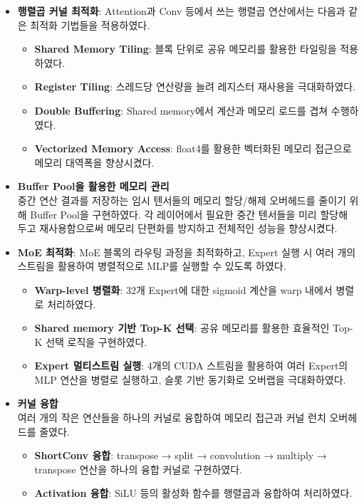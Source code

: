 \documentclass[10pt]{article}
\begin{document}
\begin{itemize}
\item \textbf{행렬곱 커널 최적화}: Attention과 Conv 등에서 쓰는 행렬곱 연산에서는 다음과 같은 최적화 기법들을 적용하였다.
\begin{itemize}[noitemsep]
    \item \textbf{Shared Memory Tiling}: 블록 단위로 공유 메모리를 활용한 타일링을 적용하였다.
    \item \textbf{Register Tiling}: 스레드당 연산량을 늘려 레지스터 재사용을 극대화하였다.
    \item \textbf{Double Buffering}: Shared memory에서 계산과 메모리 로드를 겹쳐 수행하였다.
    \item \textbf{Vectorized Memory Access}: float4를 활용한 벡터화된 메모리 접근으로 메모리 대역폭을 향상시켰다.
\end{itemize}

\item \textbf{Buffer Pool을 활용한 메모리 관리}\\
중간 연산 결과를 저장하는 임시 텐서들의 메모리 할당/해제 오버헤드를 줄이기 위해 Buffer Pool을 구현하였다. 각 레이어에서 필요한 중간 텐서들을 미리 할당해 두고 재사용함으로써 메모리 단편화를 방지하고 전체적인 성능을 향상시켰다.

\item \textbf{MoE 최적화}: MoE 블록의 라우팅 과정을 최적화하고, Expert 실행 시 여러 개의 스트림을 활용하여 병렬적으로 MLP를 실행할 수 있도록 하였다.
\begin{itemize}[noitemsep]
    \item \textbf{Warp-level 병렬화}: 32개 Expert에 대한 sigmoid 계산을 warp 내에서 병렬로 처리하였다.
    \item \textbf{Shared memory 기반 Top-K 선택}: 공유 메모리를 활용한 효율적인 Top-K 선택 로직을 구현하였다.
    \item \textbf{Expert 멀티스트림 실행}: 4개의 CUDA 스트림을 활용하여 여러 Expert의 MLP 연산을 병렬로 실행하고, 슬롯 기반 동기화로 오버랩을 극대화하였다.
\end{itemize}

\item \textbf{커널 융합}\\
여러 개의 작은 연산들을 하나의 커널로 융합하여 메모리 접근과 커널 런치 오버헤드를 줄였다.
\begin{itemize}[noitemsep]
    \item \textbf{ShortConv 융합}: transpose → split → convolution → multiply → transpose 연산을 하나의 융합 커널로 구현하였다.
    \item \textbf{Activation 융합}: SiLU 등의 활성화 함수를 행렬곱과 융합하여 처리하였다.
\end{itemize}
\end{itemize}
\end{document}
